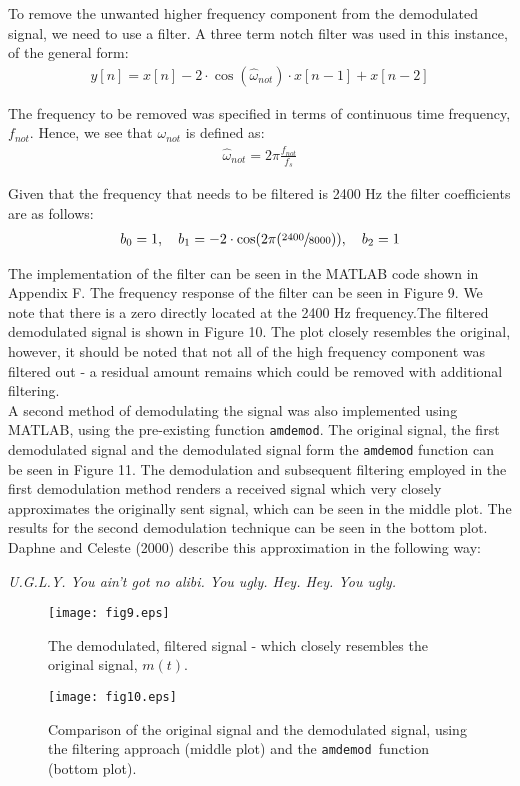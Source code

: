 \documentclass{article}
\begin{document}
To remove the unwanted higher frequency component from the demodulated signal, we need to use a filter. A three term notch filter was used in this instance, of the general form:
\begin{align*}
	y[n] = x[n] - 2 \cdot \cos (\hat{\omega}_{not}) \cdot x[n-1] + x[n - 2]
\end{align*}

The frequency to be removed was specified in terms of continuous time frequency, $f_{not}$. Hence, we see that $\omega_{not}$ is defined as:
\begin{align*}
	\hat{\omega}_{not} = 2 \pi \frac{f_{not}}{f_s}
\end{align*}

Given that the frequency that needs to be filtered is 2400 $\si{\hertz}$ the filter coefficients are as follows:
\begin{align*}
	b_0 = 1, \quad b_1 = -2 \cdot \cos (2 \pi (\sfrac{2400}{8000})), \quad b_2 = 1
\end{align*} 

The implementation of the filter can be seen in the MATLAB code shown in Appendix F. The frequency response of the filter can be seen in Figure 9. We note that there is a zero directly located at the 2400 $\si{\hertz}$ frequency.The filtered demodulated signal is shown in Figure 10. The plot closely resembles the original, however, it should be noted that not all of the high frequency component was filtered out - a residual amount remains which could be removed with additional filtering.\\

A second method of demodulating the signal was also implemented using MATLAB, using the pre-existing function \verb|amdemod|. The original signal, the first demodulated signal and the demodulated signal form the \verb|amdemod| function can be seen in Figure 11. The demodulation and subsequent filtering employed in the first demodulation method renders a received signal which very closely approximates the originally sent signal, which can be seen in the middle plot. The results for the second demodulation technique can be seen in the bottom plot. Daphne and Celeste (2000) describe this approximation in the following way:

\begin{center}
	\textit{U.G.L.Y. You ain't got no alibi. You ugly. Hey. Hey. You ugly.}
\end{center}

\begin{figure}[H]
	\begin{minipage}[t]{0.45\linewidth}
		\centering
		\texttt{[image: fig9.eps]}
		\caption{The demodulated, filtered signal - which closely resembles the original signal, $m(t)$.}
	\end{minipage}
	\hspace{1cm}
	\begin{minipage}[t]{0.45\linewidth}
		\centering
		\texttt{[image: fig10.eps]}
		\cprotect\caption{Comparison of the original signal and the demodulated signal, using the filtering approach (middle plot) and the \verb|amdemod |function (bottom plot).}
	\end{minipage}
\end{figure}
\end{document}
